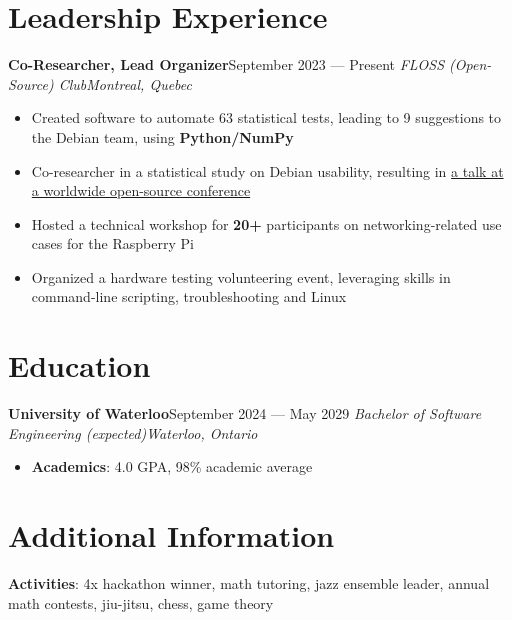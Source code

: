 \documentclass{article}
\newcommand{\newrole}[4]{
    {\normalfont\textbf{#1}\hfill#3}
    \newline
    \textit{#2}\hfill\textit{#4}
}
\newenvironment{bulletpoints}{\begin{itemize}\setlength\itemsep{-0.2em}}{\end{itemize}}
\begin{document}
\section*{Leadership Experience}
\newrole{Co-Researcher, Lead Organizer}{FLOSS (Open-Source) Club}{September 2023 --- Present}{Montreal, Quebec}
\begin{bulletpoints}
    \item Created software to automate 63 statistical tests, leading to 9 suggestions to the Debian team, using \textbf{Python/NumPy}
    \item Co-researcher in a statistical study on Debian usability, resulting in \href{https://debconf24.debconf.org/talks/49-debian-installer-usability-tests-take-2/}{a talk at a worldwide open-source conference\;\faExternalLink}
    \item Hosted a technical workshop for \textbf{20+} participants on networking-related use cases for the Raspberry Pi
    \item Organized a hardware testing volunteering event, leveraging skills in command-line scripting, troubleshooting and Linux
\end{bulletpoints}

\section*{Education}

\newrole{University of Waterloo}{Bachelor of Software Engineering (expected)}{September 2024 --- May 2029}{Waterloo, Ontario}
\begin{bulletpoints}
    \vspace*{-2pt}
    \item {\bfseries Academics}: 4.0 GPA, 98\% academic average
\end{bulletpoints}

\section*{Additional Information}
{\bfseries Activities}: 4x hackathon winner, math tutoring, jazz ensemble leader, annual math contests, jiu-jitsu, chess, game theory
\end{document}

